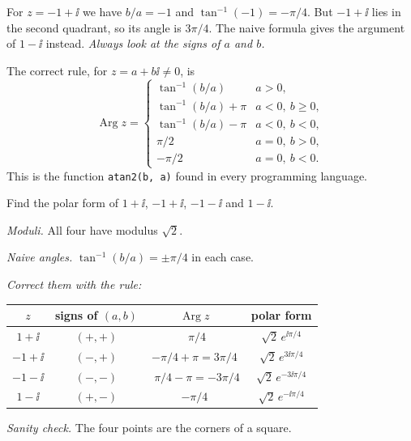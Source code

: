 \begin{pitfall}
  For $z=-1+\ii$ we have $b/a=-1$ and $\tan^{-1}(-1)=-\pi/4$. But $-1+\ii$ lies in the second quadrant, so its angle is $3\pi/4$. The naive formula gives the argument of $1-\ii$ instead. \emph{Always look at the signs of $a$ and $b$.}
\end{pitfall}

The correct rule, for $z=a+b\ii\ne0$, is
\[
  \operatorname{Arg}z=
  \begin{cases}
    \tan^{-1}(b/a) & a>0,\\
    \tan^{-1}(b/a)+\pi & a<0,\ b\ge0,\\
    \tan^{-1}(b/a)-\pi & a<0,\ b<0,\\
    \pi/2 & a=0,\ b>0,\\
    -\pi/2 & a=0,\ b<0.
  \end{cases}
\]
This is the function \texttt{atan2(b, a)} found in every programming language.

\begin{example}\label{ex:args}
  Find the polar form of $1+\ii$, $-1+\ii$, $-1-\ii$ and $1-\ii$.
\end{example}
\begin{solution}
  \begin{steps}
    \item \emph{Moduli.} All four have modulus $\sqrt2$.
    \item \emph{Naive angles.} $\tan^{-1}(b/a)=\pm\pi/4$ in each case.
    \item \emph{Correct them with the rule:}
      \begin{center}
      \begin{tabular}{cccc}
        \toprule
        $z$ & signs of $(a,b)$ & $\operatorname{Arg}z$ & polar form\\
        \midrule
        $1+\ii$  & $(+,+)$ & $\ \ \pi/4$    & $\sqrt2\,e^{\ii\pi/4}$\\
        $-1+\ii$ & $(-,+)$ & $-\pi/4+\pi=3\pi/4$   & $\sqrt2\,e^{3\ii\pi/4}$\\
        $-1-\ii$ & $(-,-)$ & $\ \ \pi/4-\pi=-3\pi/4$ & $\sqrt2\,e^{-3\ii\pi/4}$\\
        $1-\ii$  & $(+,-)$ & $-\pi/4$       & $\sqrt2\,e^{-\ii\pi/4}$\\
        \bottomrule
      \end{tabular}
      \end{center}
    \item \emph{Sanity check.} The four points are the corners of a square.
  \end{steps}
\end{solution}

